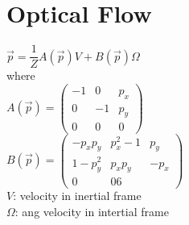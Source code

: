 \section{Optical Flow}
$\vec{p} = \dfrac{1}{Z} A(\vec{p}) V + B(\vec{p}) \Omega$\\
where \\
$A(\vec{p}) = \begin{pmatrix}
  -1 & 0 & p_x \\ 0 & -1 & p_y \\ 0 & 0 & 0
\end{pmatrix}$\\
$B(\vec{p}) = \begin{pmatrix}
  -p_x p_y & p_x^2 -1 & p_y \\
  1- p_y^2 & p_x p_y & -p_x \\
  0 & 0 6
\end{pmatrix}$\\
$V$: velocity in \alert{inertial frame}\\
$\Omega$: ang velocity in \alert{intertial frame}
